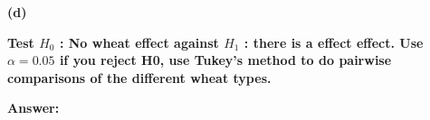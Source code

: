 \documentclass[letterpaper,11pt]{article}
\begin{document}
    \bigbreak
    \begin{addmargin}[-1.1em]{0em}
    \textbf{(d)}\par\end{addmargin}
      \textbf{Test $H_0$ : No wheat effect against $H_1$ : there is a effect effect. Use $\alpha = 0.05$ if you reject H0, use Tukey’s method to do pairwise comparisons of the different wheat types.}\par
    \bigbreak
    \begin{addmargin}[-0.5em]{0em}
    \textbf{Answer: }\end{addmargin}
\end{document}
